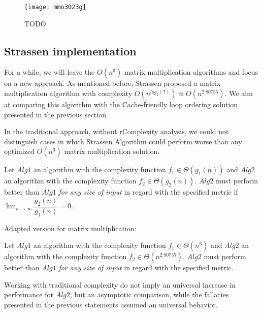 \begin{table}[H]
\begin{tabular}
\end{tabular}
\caption{The regression model was evaluated using the above metrics: Root Mean Square Error (RMSE) and $R^2$ (coefficient of determination) regression score function.}
\end{table}

\begin{figure}[H]
\centering
\texttt{[image: mmn3023g]}
\caption{TODO}
\end{figure}

\subsection{Strassen implementation}

For a while, we will leave the $O(n^3)$ matrix multiplication algorithms and focus on a new approach. As mentioned before, Strassen proposed a matrix multiplication algorithm with complexity $O(n^{log_{2}(7)}) \approx O(n^{2.80735})$. We aim at comparing this algorithm with the Cache-friendly loop ordering solution presented in the previous section. 

In the traditional approach, without rComplexity analysis, we could not distinguish cases in which Strassen Algorithm could perform worse than any optimized $O(n^3)$ matrix multiplication solution.


\begin{fallacy}
Let $Alg1$ an algorithm with the complexity function $f_{1} \in \Theta(g_1(n))$  and $Alg2$ an algorithm with the complexity function $f_{2} \in \Theta(g_2(n))$. $Alg2$ must perform better than $Alg1$ \textit{for any size of input} in regard with the specified metric if $\lim_{n\to\infty} \dfrac{g_2(n)}{g_1(n)} = 0$.
\end{fallacy}


\begin{fallacy}
Adapted version for matrix multiplication: 

Let $Alg1$ an algorithm with the complexity function $f_{1} \in \Theta(n^3)$  and $Alg2$ an algorithm with the complexity function $f_{2} \in \Theta(n^{2.80735})$. $Alg2$ must perform better than $Alg1$ \textit{for any size of input} in regard with the specified metric.
\end{fallacy}

Working with traditional complexity do not imply an universal increase in performance for $Alg2$, but an asymptotic comparison, while the fallacies presented in the previous statements assumed an universal behavior.

